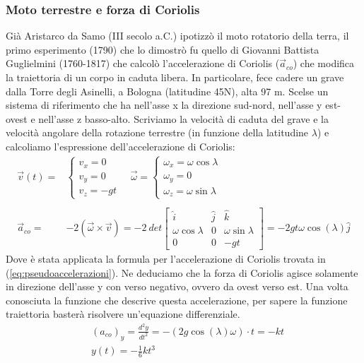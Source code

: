 \documentclass[10pt,a4paper]{article}
\begin{document}
\subsubsection*{Moto terrestre e forza di Coriolis}
Già Aristarco da Samo (III secolo a.C.) ipotizzò il moto rotatorio della  terra, il primo esperimento (1790) che lo dimostrò fu quello di Giovanni Battista Guglielmini (1760-1817) che calcolò l'accelerazione di Coriolis ($\vec{a}_{co}$) che modifica la traiettoria di un corpo in caduta libera. In particolare, fece cadere un grave dalla Torre degli Asinelli, a Bologna (latitudine 45\textdegree N), alta 97 m. Scelse un sistema di riferimento che ha nell'asse x la direzione sud-nord, nell'asse y est-ovest e nell'asse z basso-alto. Scriviamo la velocità di caduta del grave e la velocità angolare della rotazione terrestre (in funzione della latitudine $\lambda$) e calcoliamo l'espressione dell'accelerazione di Coriolis:
\begin{align*}
\vec{v} (t)=&
\begin{cases}
	v_x = 0\\
	v_y = 0\\
	v_z = -gt
\end{cases} \quad 
\vec{\omega} = 
\begin{cases}
	\omega_x=\omega\cos \lambda\\
	\omega_y=0\\
	\omega_z=\omega\sin\lambda
\end{cases}\\\\
\vec{a}_{co} =& -2(\vec{\omega} \times \vec{v}) =
 -2\ det\begin{bmatrix}
	\hat{i}           & \hat{j} & \hat{k}\\
	\omega\cos\lambda & 0       &\omega\sin\lambda\\
	0                 & 0       & -gt 
\end{bmatrix}
= -2gt\omega\cos(\lambda) \hat{j}
\end{align*}
Dove è stata applicata la formula per l'accelerazione di Coriolis trovata in (\ref{eq:pseudoaccelerazioni}). Ne deduciamo che la forza di Coriolis agisce solamente in direzione dell'asse y con verso negativo, ovvero da ovest verso est. Una volta conosciuta la funzione che descrive questa accelerazione, per sapere la funzione traiettoria basterà risolvere un'equazione differenziale.
\begin{align*}
	&(a_{co})_y= \frac{d^2y}{dt^2} = -(2g\cos(\lambda)\omega)\cdot t = -kt\\
	&y(t) = -\frac{1}{6}kt^3
\end{align*}
\end{document}
